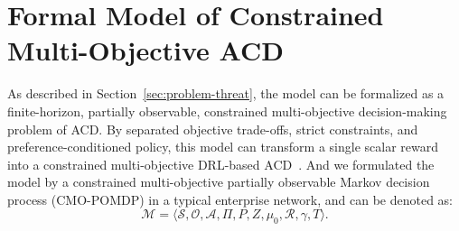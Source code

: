 \documentclass[sigconf,review,anonymous]{acmart}
\begin{document}



\section{Formal Model of Constrained Multi-Objective ACD}
\label{sec:formulation}



As described in Section~\ref{sec:problem-threat}, the model can be formalized as a finite-horizon, partially observable, constrained multi-objective decision-making problem of ACD. 
By separated objective trade-offs, strict constraints, and preference-conditioned policy, this model can transform a single scalar reward into a constrained multi-objective DRL-based ACD~\cite{roijers2013survey,hayes2022practical,altman2021cmdp}.
And we formulated the model by a constrained multi-objective partially observable Markov decision process (CMO-POMDP) in a typical enterprise network, and can be denoted as:
% 
\begin{equation}
\mathcal{M}
=
\langle
\mathcal{S},
\mathcal{O},
\mathcal{A},
\mathcal{\Pi},
P,
Z,
\mu_0,
\mathcal{R},
\gamma,
T
\rangle .
\label{eq:defense-process}
\end{equation}
\end{document}
